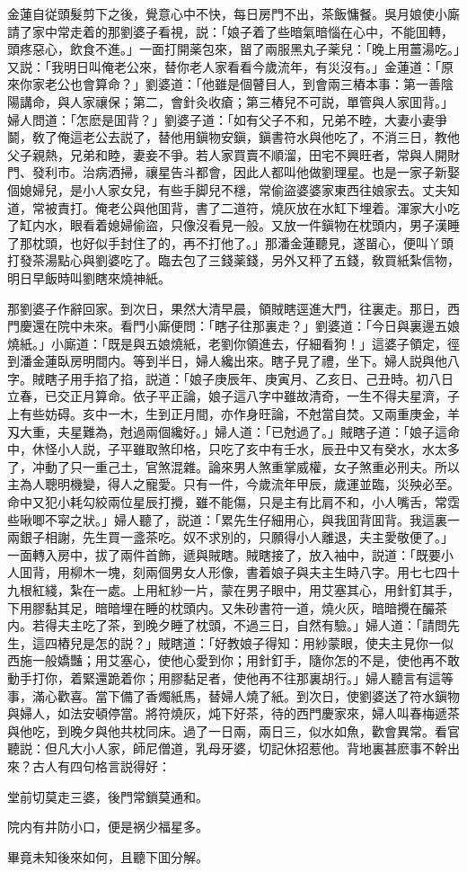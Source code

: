 金蓮自従頭髮剪下之後，覺意心中不快，每日房門不出，茶飯慵餐。吳月娘使小廝請了家中常走着的那劉婆子看視，説：「娘子着了些暗氣暗惱在心中，不能囬轉，頭疼惡心，飲食不進。」一面打開薬包來，㽞了兩服黑丸子薬兒：「晚上用薑湯吃。」又説：「我明日叫俺老公來，替你老人家看看今歲流年，有災沒有。」金蓮道：「原來你家老公也會算命？」劉婆道：「他雖是個瞽目人，到會兩三樁本事：第一善陰陽講命，與人家禳保；第二，會針灸收瘡；第三樁兒不可説，單管與人家囬背。」婦人問道：「怎麽是囬背？」劉婆子道：「如有父子不和，兄弟不睦，大妻小妻爭鬬，敎了俺這老公去説了，替他用鎭物安鎭，鎭書符水與他吃了，不消三日，教他父子親熱，兄弟和睦，妻妾不爭。若人家買賣不順溜，田宅不興旺者，常與人開財門、發利市。治病洒掃，禳星告斗都會，因此人都叫他做劉理星。也是一家子新娶個媳婦兒，是小人家女兒，有些手脚兒不穩，常偷盜婆婆家東西往娘家去。丈夫知道，常被責打。俺老公與他囬背，書了二道符，燒灰放在水缸下埋着。渾家大小吃了缸内水，眼看着媳婦偷盜，只像沒看見一般。又放一件鎭物在枕頭内，男子漢睡了那枕頭，也好似手封住了的，再不打他了。」那潘金蓮聽見，遂㽞心，便叫丫頭打發茶湯點心與劉婆吃了。臨去包了三錢薬錢，另外又秤了五錢，敎買紙紮信物，明日早飯時叫劉瞎來燒神紙。

那劉婆子作辭回家。到次日，果然大清早晨，領賊瞎逕進大門，往裏走。那日，西門慶還在院中未來。看門小廝便問：「瞎子往那裏走？」劉婆道：「今日與裏邊五娘燒紙。」小廝道：「既是與五娘燒紙，老劉你領進去，仔細看狗！」這婆子領定，徑到潘金蓮臥房明間内。等到半日，婦人纔出來。瞎子見了禮，坐下。婦人説與他八字。賊瞎子用手掐了掐，説道：「娘子庚辰年、庚寅月、乙亥日、己丑時。初八日立春，已交正月算命。依子平正論，娘子這八字中雖故清奇，一生不得夫星濟，子上有些妨碍。亥中一木，生到正月間，亦作身旺論，不尅當自焚。又兩重庚金，羊刄大重，夫星難為，尅過兩個纔好。」婦人道：「已尅過了。」賊瞎子道：「娘子這命中，休怪小人説，子平雖取煞印格，只吃了亥中有壬水，辰丑中又有癸水，水太多了，冲動了只一重己土，官煞混雜。論來男人煞重掌威權，女子煞重必刑夫。所以主為人聰明機變，得人之寵愛。只有一件，今歲流年甲辰，歲運並臨，災殃必至。命中又犯小耗勾絞兩位星辰打攪，雖不能傷，只是主有比肩不和，小人嘴舌，常霑些啾唧不寜之狀。」婦人聽了，説道：「累先生仔細用心，與我囬背囬背。我這裏一兩銀子相謝，先生買一盞茶吃。奴不求別的，只願得小人離退，夫主愛敬便了。」一面轉入房中，拔了兩件首飾，遞與賊瞎。賊瞎接了，放入袖中，説道：「既要小人囬背，用柳木一塊，刻兩個男女人形像，書着娘子與夫主生時八字。用七七四十九根紅綫，紮在一處。上用紅紗一片，蒙在男子眼中，用艾塞其心，用針釘其手，下用膠黏其足，暗暗埋在睡的枕頭内。又朱砂書符一道，燒火灰，暗暗攪在釅茶内。若得夫主吃了茶，到晚夕睡了枕頭，不過三日，自然有驗。」婦人道：「請問先生，這四樁兒是怎的説？」賊瞎道：「好教娘子得知：用紗蒙眼，使夫主見你一似西施一般嬌豔；用艾塞心，使他心愛到你；用針釘手，隨你怎的不是，使他再不敢動手打你，着緊還跪着你；用膠黏足者，使他再不往那裏胡行。」婦人聽言有這等事，滿心歡喜。當下備了香燭紙馬，替婦人燒了紙。到次日，使劉婆送了符水鎭物與婦人，如法安頓停當。將符燒灰，炖下好茶，待的西門慶家來，婦人叫春梅遞茶與他吃，到晚夕與他共枕同床。過了一日兩，兩日三，似水如魚，歡會異常。看官聽説：但凡大小人家，師尼僧道，乳母牙婆，切記休招惹他。背地裏甚麽事不幹出來？古人有四句格言説得好：

\begin{myquote}
堂前切莫走三婆，後門常鎖莫通和。

院内有井防小口，便是祸少福星多。
\end{myquote}

畢竟未知後來如何，且聽下囬分解。

